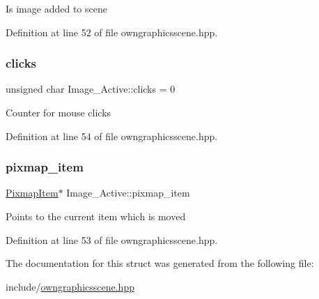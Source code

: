 Is image added to scene 

Definition at line 52 of file owngraphicsscene.\+hpp.

\mbox{\label{structImage__Active_abb039226daf0372a8d88c842f5eb140f}} 
\subsubsection{\texorpdfstring{clicks}{clicks}}
{\footnotesize\ttfamily unsigned char Image\+\_\+\+Active\+::clicks = 0}

Counter for mouse clicks 

Definition at line 54 of file owngraphicsscene.\+hpp.

\mbox{\label{structImage__Active_aa007ea3c9ba4830bbc2706af51820c20}} 
\subsubsection{\texorpdfstring{pixmap\+\_\+item}{pixmap\_item}}
{\footnotesize\ttfamily \mbox{\hyperlink{classPixmapItem}{Pixmap\+Item}}$\ast$ Image\+\_\+\+Active\+::pixmap\+\_\+item}

Points to the current item which is moved 

Definition at line 53 of file owngraphicsscene.\+hpp.



The documentation for this struct was generated from the following file\+:\begin{DoxyCompactItemize}
\item 
include/\mbox{\hyperlink{owngraphicsscene_8hpp}{owngraphicsscene.\+hpp}}\end{DoxyCompactItemize}
